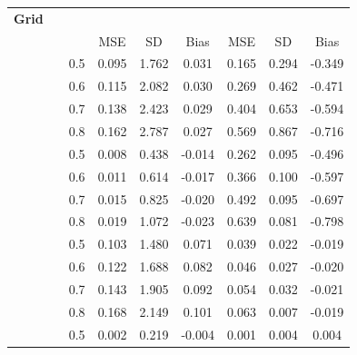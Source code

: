 \documentclass{article}[11pt]
\begin{document}
\begin{table}[ht!]
\centering
{\linespread{1.0}\small\selectfont
\setlength{\tabcolsep}{4.5pt}
\begin{tabular}{l c c ccc ccc}
    \toprule
    \textbf{Grid} & \textbf{} & \textbf{} &  &  \\
    \cmidrule(lr){4-6} \cmidrule(lr){7-9}
    & & & MSE & SD & Bias & MSE & SD & Bias \\
    \midrule
     &  & 0.5 & 0.095 & 1.762 & 0.031 & 0.165 & 0.294 & -0.349 \\
    & & 0.6 & 0.115 & 2.082 & 0.030 & 0.269 & 0.462 & -0.471 \\
    & & 0.7 & 0.138 & 2.423 & 0.029 & 0.404 & 0.653 & -0.594 \\
    & & 0.8 & 0.162 & 2.787 & 0.027 & 0.569 & 0.867 & -0.716 \\
    \cmidrule(lr){2-9}
    &  & 0.5 & 0.008 & 0.438 & -0.014 & 0.262 & 0.095 & -0.496 \\
    & & 0.6 & 0.011 & 0.614 & -0.017 & 0.366 & 0.100 & -0.597 \\
    & & 0.7 & 0.015 & 0.825 & -0.020 & 0.492 & 0.095 & -0.697 \\
    & & 0.8 & 0.019 & 1.072 & -0.023 & 0.639 & 0.081 & -0.798 \\
    \midrule
     &  & 0.5 & 0.103 & 1.480 & 0.071 & 0.039 & 0.022 & -0.019 \\
    & & 0.6 & 0.122 & 1.688 & 0.082 & 0.046 & 0.027 & -0.020 \\
    & & 0.7 & 0.143 & 1.905 & 0.092 & 0.054 & 0.032 & -0.021 \\
    & & 0.8 & 0.168 & 2.149 & 0.101 & 0.063 & 0.007 & -0.019 \\
    \cmidrule(lr){2-9}
    &  & 0.5 & 0.002 & 0.219 & -0.004 & 0.001 & 0.004 & 0.004 \\

\end{tabular}}
\end{table}
\end{document}
